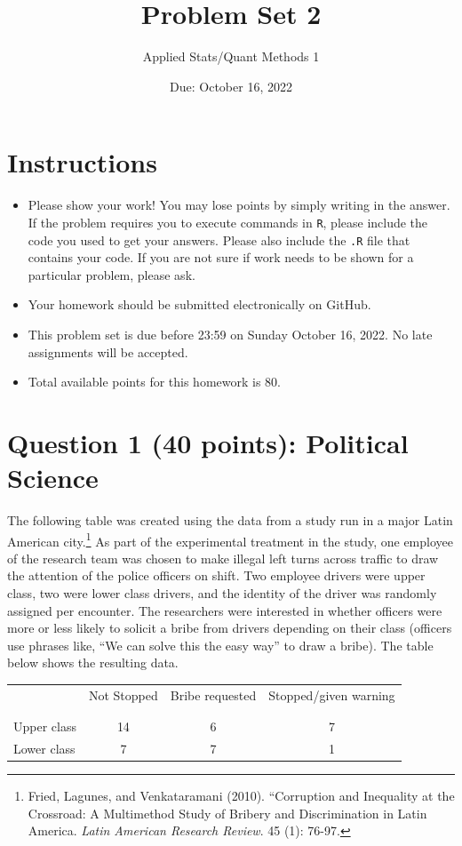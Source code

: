 \documentclass[12pt,letterpaper]{article}
\title{Problem Set 2}
\date{Due: October 16, 2022}
\author{Applied Stats/Quant Methods 1}
\begin{document}
	\maketitle
	\section*{Instructions}
	\begin{itemize}
		\item Please show your work! You may lose points by simply writing in the answer. If the problem requires you to execute commands in \texttt{R}, please include the code you used to get your answers. Please also include the \texttt{.R} file that contains your code. If you are not sure if work needs to be shown for a particular problem, please ask.
		\item Your homework should be submitted electronically on GitHub.
		\item This problem set is due before 23:59 on Sunday October 16, 2022. No late assignments will be accepted.
		\item Total available points for this homework is 80.
	\end{itemize}
	
	
	\vspace{.5cm}
	\section*{Question 1 (40 points): Political Science}
	\vspace{.25cm}
	The following table was created using the data from a study run in a major Latin American city.\footnote{Fried, Lagunes, and Venkataramani (2010). ``Corruption and Inequality at the Crossroad: A Multimethod Study of Bribery and Discrimination in Latin America. \textit{Latin American Research Review}. 45 (1): 76-97.} As part of the experimental treatment in the study, one employee of the research team was chosen to make illegal left turns across traffic to draw the attention of the police officers on shift. Two employee drivers were upper class, two were lower class drivers, and the identity of the driver was randomly assigned per encounter. The researchers were interested in whether officers were more or less likely to solicit a bribe from drivers depending on their class (officers use phrases like, ``We can solve this the easy way'' to draw a bribe). The table below shows the resulting data.
	
	\newpage
	\begin{table}[h!]
		\centering
		\begin{tabular}{l | c c c }
			& Not Stopped & Bribe requested & Stopped/given warning \\
			\\[-1.8ex] 
			\hline \\[-1.8ex]
			Upper class & 14 & 6 & 7 \\
			Lower class & 7 & 7 & 1 \\
			\hline
		\end{tabular}
	\end{table}
	
\end{document}
